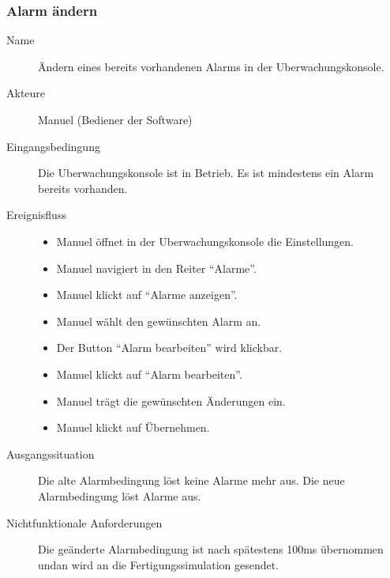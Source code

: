 \documentclass[parskip=full]{scrartcl}
\begin{document}
\subsubsection{Alarm \"andern}
\begin{description}
 \item[Name] \"Andern eines bereits vorhandenen Alarms in der \gls{Uberwachungskonsole}.
 \item[Akteure] Manuel (Bediener der Software)
 \item[Eingangsbedingung] Die \gls{Uberwachungskonsole} ist in Betrieb. Es ist mindestens ein Alarm bereits vorhanden.
 \item[Ereignisfluss]
 \begin{itemize}[noitemsep]
  \item Manuel \"offnet in der \gls{Uberwachungskonsole} die Einstellungen.
  \item Manuel navigiert in den Reiter ``Alarme''.
  \item Manuel klickt auf ``Alarme anzeigen''.
  \item Manuel w\"ahlt den gew\"unschten Alarm an.
  \item Der Button ``Alarm bearbeiten'' wird klickbar.
  \item Manuel klickt auf ``Alarm bearbeiten''.
  \item Manuel tr\"agt die gew\"unschten \"Anderungen ein.
  \item Manuel klickt auf \"Ubernehmen.
 \end{itemize}
 \item[Ausgangssituation] Die alte Alarmbedingung l\"ost keine Alarme mehr aus. Die neue Alarmbedingung l\"ost Alarme aus.
 \item [Nichtfunktionale Anforderungen] Die ge\"anderte Alarmbedingung ist nach sp\"atestens 100ms \"ubernommen undan
  wird an die Fertigungssimulation gesendet.
\end{description}
\end{document}
